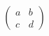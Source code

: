 \begin{equation}    \label{gnlsl2z}
\left( \begin{array}{cc}
       a & b \\
       c & d
       \end{array} \right)
\end{equation}

